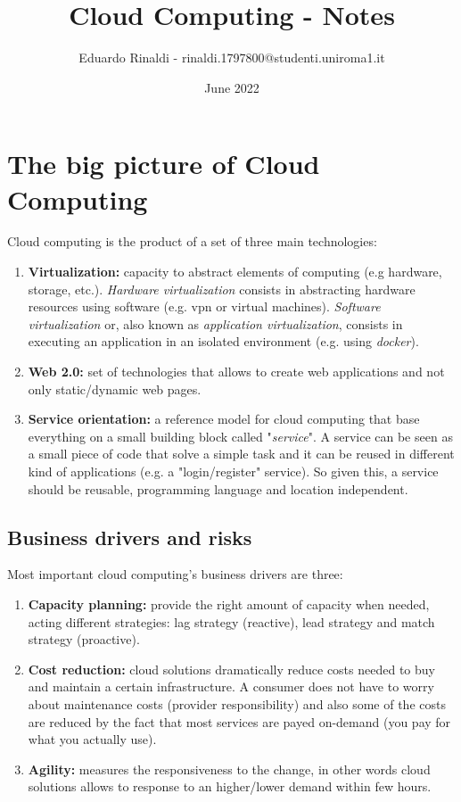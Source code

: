 \documentclass{article}
\title{Cloud Computing - Notes}
\author{Eduardo Rinaldi - rinaldi.1797800@studenti.uniroma1.it}
\date{June 2022}
\begin{document}
\maketitle
\tableofcontents
\newpage

\section{The big picture of Cloud Computing}
Cloud computing is the product of a set of three main technologies:
\begin{enumerate}
    \item \textbf{Virtualization:} capacity to abstract elements of computing (e.g hardware, storage, etc.). \textit{Hardware virtualization} consists in abstracting hardware resources using software (e.g. vpn or virtual machines). \textit{Software virtualization} or, also known as \textit{application virtualization}, consists in executing an application in an isolated environment (e.g. using \textit{docker}).
    \item \textbf{Web 2.0:} set of technologies that allows to create web applications and not only static/dynamic web pages.
    \item \textbf{Service orientation:} a reference model for cloud computing that base everything on a small building block called "\textit{service}". A service can be seen as a small piece of code that solve a simple task and it can be reused in different kind of applications (e.g. a "login/register" service). So given this, a service should be reusable, programming language and location independent.
\end{enumerate}

\subsection{Business drivers and risks}
Most important cloud computing's business drivers are three:
\begin{enumerate}
    \item \textbf{Capacity planning:} provide the right amount of capacity when needed, acting different strategies: lag strategy (reactive), lead strategy and match strategy (proactive).
    \item \textbf{Cost reduction:} cloud solutions dramatically reduce costs needed to buy and maintain a certain infrastructure. A consumer does not have to worry about maintenance costs (provider responsibility) and also some of the costs are reduced by the fact that most services are payed on-demand (you pay for what you actually use).
    \item \textbf{Agility:} measures the responsiveness to the change, in other words cloud solutions allows to response to an higher/lower demand within few hours.
\end{enumerate}
\end{document}
